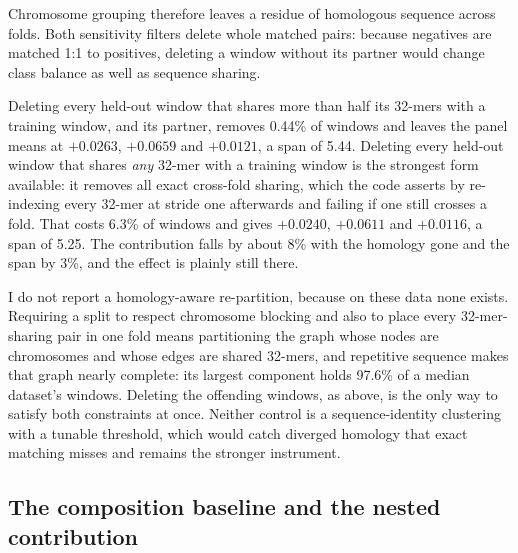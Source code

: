 Chromosome grouping therefore leaves a residue of homologous sequence across folds. Both
sensitivity filters delete whole matched pairs: because negatives are matched 1:1 to positives,
deleting a window without its partner would change class balance as well as sequence sharing.

Deleting every held-out window that shares more than half its 32-mers with a training window,
and its partner, removes 0.44\% of windows and leaves the panel means at $+0.0263$, $+0.0659$
and $+0.0121$, a span of 5.44. Deleting every held-out window that shares \emph{any} 32-mer with
a training window is the strongest form available: it removes all exact cross-fold sharing,
which the code asserts by re-indexing every 32-mer at stride one afterwards and failing if one
still crosses a fold. That costs 6.3\% of windows and gives $+0.0240$, $+0.0611$ and $+0.0116$,
a span of 5.25. The contribution falls by about 8\% with the homology gone and the span by 3\%,
and the effect is plainly still there.

I do not report a homology-aware re-partition, because on these data none exists. Requiring a
split to respect chromosome blocking and also to place every 32-mer-sharing pair in one fold
means partitioning the graph whose nodes are chromosomes and whose edges are shared 32-mers,
and repetitive sequence makes that graph nearly complete: its largest component holds 97.6\% of
a median dataset's windows. Deleting the offending windows, as above, is the only way to satisfy
both constraints at once. Neither control is a sequence-identity clustering with a tunable
threshold, which would catch diverged homology that exact matching misses and remains the
stronger instrument.

\subsection{The composition baseline and the nested contribution}
\label{sec:nested-estimator}

